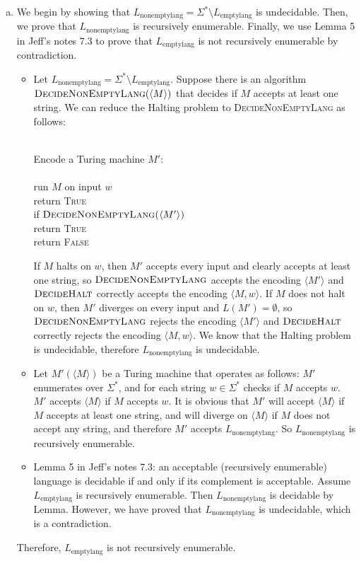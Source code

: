 \documentclass[11pt]{article}
\begin{document}
\begin{solution}
\begin{enumerate}[(a)]
\item We begin by showing that $L_{\text{nonemptylang}}=\Sigma^* \setminus L_{\text{emptylang}}$ is undecidable. Then, we prove that $L_{\text{nonemptylang}}$ is recursively enumerable. Finally, we use Lemma 5 in Jeff's notes 7.3 to prove that $L_{\text{emptylang}}$ is not recursively enumerable by contradiction.
\begin{itemize}
\item Let $L_{\text{nonemptylang}}=\Sigma^* \setminus L_{\text{emptylang}}$. Suppose there is an algorithm $\textsc{DecideNonEmptyLang}(\langle M \rangle)$ that decides if $M$ accepts at least one string. We can reduce the Halting problem to \textsc{DecideNonEmptyLang} as follows:
\begin{algo}
	\textsc{}\+
\\	Encode a Turing machine $M'$:\+
\\	\+
\\	run $M$ on input $w$
\\	return \textsc{True}\-\-
\\	if $\textsc{DecideNonEmptyLang($\langle M' \rangle$)}$\+
\\	return \textsc{True}\-
\\	return \textsc{False}\-
\end{algo}
If $M$ halts on $w$, then $M'$ accepts every input and clearly accepts at least one string, so $\textsc{DecideNonEmptyLang}$ accepts the encoding $\langle M' \rangle$ and $\textsc{DecideHalt}$ correctly accepts the encoding $\langle M,w \rangle$. If $M$ does not halt on $w$, then $M'$ diverges on every input and $L(M')=\emptyset$, so $\textsc{DecideNonEmptyLang}$ rejects the encoding $\langle M' \rangle$ and $\textsc{DecideHalt}$ correctly rejects the encoding $\langle M,w \rangle$. We know that the Halting problem is undecidable, therefore $L_{\text{nonemptylang}}$ is undecidable.

\item Let $M'(\langle M \rangle)$ be a Turing machine that operates as follows: $M'$ enumerates over $\Sigma^*$, and for each string $w\in \Sigma^*$ checks if $M$ accepts $w$. $M'$ accepts $\langle M \rangle$ if $M$ accepts $w$. It is obvious that $M'$ will accept $\langle M \rangle$ if $M$ accepts at least one string, and will diverge on $\langle M \rangle$ if $M$ does not accept any string, and therefore $M'$ accepts $L_{\text{nonemptylang}}$. So $L_{\text{nonemptylang}}$ is recursively enumerable.

\item Lemma 5 in Jeff's notes 7.3: an acceptable (recursively enumerable) language is decidable if and only if its complement is acceptable. Assume $L_{\text{emptylang}}$ is recursively enumerable. Then $L_{\text{nonemptylang}}$ is decidable by Lemma. However, we have proved that $L_{\text{nonemptylang}}$ is undecidable, which is a contradiction.
\end{itemize}
Therefore, $L_{\text{emptylang}}$ is not recursively enumerable.
\end{enumerate}
\end{solution}
\end{document}

